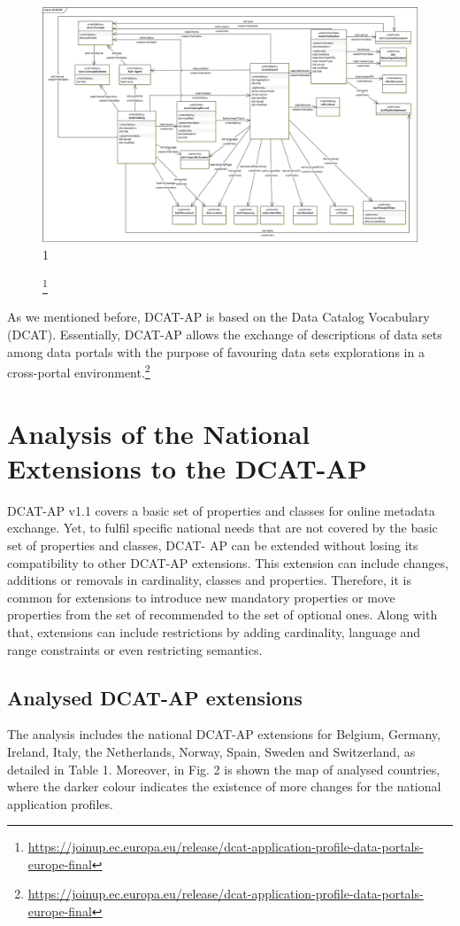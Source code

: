 \documentclass[<options>]{elsarticle}
\begin{document}
\begin{figure}[H]
\includegraphics[width=1\textwidth]{DCAT-AP_Final_v1_00.png}
1\caption[Caption for LOC]{\footnote{\href{DCAT-AP UML Class Diagram}{https://joinup.ec.europa.eu/release/dcat-application-profile-data-portals-europe-final}}}
\end{figure}

As we mentioned before, DCAT-AP is based on the Data Catalog Vocabulary (DCAT). Essentially, DCAT-AP allows the exchange of descriptions of data sets among data portals with the purpose of favouring data sets explorations in a cross-portal environment.\footnote{\href{DCAT Application Profile for Data Portals in Europe}{https://joinup.ec.europa.eu/release/dcat-application-profile-data-portals-europe-final}}

\section{Analysis of the National Extensions to the DCAT-AP}
DCAT-AP v1.1 covers a basic set of properties and classes for online metadata exchange. Yet, to fulfil specific national needs that are not covered by the basic set of properties and classes, DCAT- AP can be extended without losing its compatibility to other DCAT-AP extensions. This extension can include changes, additions or removals in cardinality, classes and properties. Therefore, it is common for extensions to introduce new mandatory properties or move properties from the set of recommended to the set of optional ones. Along with that, extensions can include restrictions by adding cardinality, language and range constraints or even restricting semantics.

\subsection{Analysed DCAT-AP extensions}
The analysis includes the national DCAT-AP extensions for Belgium, Germany, Ireland, Italy, the Netherlands, Norway, Spain, Sweden and Switzerland, as detailed in Table 1. Moreover, in Fig. 2 is shown the map of analysed countries, where the darker colour indicates the existence of more changes for the national application profiles. 
\end{document}
